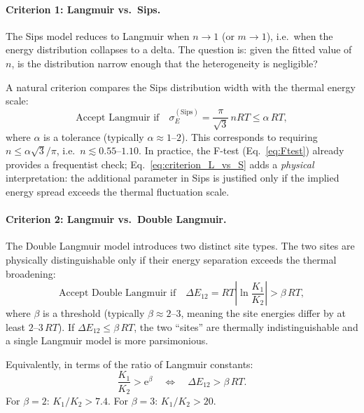 	\paragraph{Criterion 1: Langmuir vs.\ Sips.}

	The Sips model reduces to Langmuir when $n \to 1$
	(or $m \to 1$), i.e.\ when the energy distribution collapses to
	a delta. The question is: given the fitted value of $n$, is the
	distribution narrow enough that the heterogeneity is negligible?

	A natural criterion compares the Sips distribution width with the
	thermal energy scale:
	\begin{equation}
		\boxed{
			\text{Accept Langmuir if}\quad
			\sigma_E^{\mathrm{(Sips)}}
			= \frac{\pi}{\sqrt{3}}\,nRT
			\leq \alpha\, RT,
		}
		\label{eq:criterion_L_vs_S}
	\end{equation}
	where $\alpha$ is a tolerance (typically $\alpha \approx 1$--$2$).
	This corresponds to requiring $n \leq \alpha\sqrt{3}/\pi$, i.e.\
	$n \lesssim 0.55$--$1.10$. In practice, the F-test
	(Eq.~\eqref{eq:Ftest}) already provides a frequentist check;
	Eq.~\eqref{eq:criterion_L_vs_S} adds a \emph{physical}
	interpretation: the additional parameter in Sips is justified only
	if the implied energy spread exceeds the thermal fluctuation scale.

	\paragraph{Criterion 2: Langmuir vs.\ Double Langmuir.}

	The Double Langmuir model introduces two distinct site types.
	The two sites are physically distinguishable only if their
	energy separation exceeds the thermal broadening:
	\begin{equation}
		\boxed{
			\text{Accept Double Langmuir if}\quad
			\Delta E_{12}
			= RT\left|\ln\frac{K_1}{K_2}\right|
			> \beta\, RT,
		}
		\label{eq:criterion_L_vs_DL}
	\end{equation}
	where $\beta$ is a threshold (typically $\beta \approx 2$--$3$,
	meaning the site energies differ by at least $2$--$3\,RT$).
	If $\Delta E_{12} \leq \beta\,RT$, the two ``sites'' are
	thermally indistinguishable and a single Langmuir model is
	more parsimonious.

	Equivalently, in terms of the ratio of Langmuir constants:
	\begin{equation}
		\frac{K_1}{K_2} > \mathrm{e}^{\beta}
		\quad\Longleftrightarrow\quad
		\Delta E_{12} > \beta\, RT.
	\end{equation}
	For $\beta = 2$: $K_1/K_2 > 7.4$. For $\beta = 3$:
	$K_1/K_2 > 20$.

